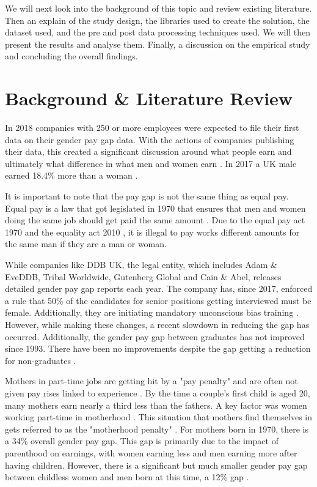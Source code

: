 \documentclass{sigchi}
\begin{document}
	We will next look into the background of this topic and review existing literature. Then an explain of the study design, the libraries used to create the solution, the dataset used, and the pre and post data processing techniques used. We will then present the results and analyse them. Finally, a discussion on the empirical study and concluding the overall findings.

\section{Background \& Literature Review}
	In 2018 companies with 250 or more employees were expected to file their first data on their gender pay gap data. With the actions of companies publishing their data, this created a significant discussion around what people earn and ultimately what difference in what men and women earn \cite{bbc_gender_pay_gap}. In 2017 a UK male earned 18.4\% more than a woman \cite{ons_gender_pay_gap_17}. 
	
	It is important to note that the pay gap is not the same thing as equal pay. Equal pay is a law that got legislated in 1970 that ensures that men and women doing the same job should get paid the same amount \cite{bbc_gender_pay_gap}. Due to the equal pay act 1970 \cite{equal_pay_act_1070} and the equality act 2010 \cite{equal_act_2010}, it is illegal to pay works different amounts for the same man if they are a man or woman.
	
	While companies like DDB UK, the legal entity, which includes Adam \& EveDDB, Tribal Worldwide, Gutenberg Global and Cain \& Abel, releases detailed gender pay gap reports each year. The company has, since 2017, enforced a rule that 50\% of the candidates for senior positions getting interviewed must be female. Additionally, they are initiating mandatory unconscious bias training \cite{uk_gender_gap}. However, while making these changes, a recent slowdown in reducing the gap has occurred. Additionally, the gender pay gap between graduates has not improved since 1993. There have been no improvements despite the gap getting a reduction for non-graduates \cite{bbc_mothers_suffering}.
	
	Mothers in part-time jobs are getting hit by a "pay penalty" and are often not given pay rises linked to experience \cite{bbc_mothers_suffering}.
	By the time a couple's first child is aged 20, many mothers earn nearly a third less than the fathers. A key factor was women working part-time in motherhood \cite{ifs_mothers_suffer}. This situation that mothers find themselves in gets referred to as the "motherhood penalty" \cite{tuc_motherhood}. For mothers born in 1970, there is a 34\% overall gender pay gap. This gap is primarily due to the impact of parenthood on earnings, with women earning less and men earning more after having children. However, there is a significant but much smaller gender pay gap between childless women and men born at this time, a 12\% gap \cite{tuc_motherhood}.
	
\end{document}
